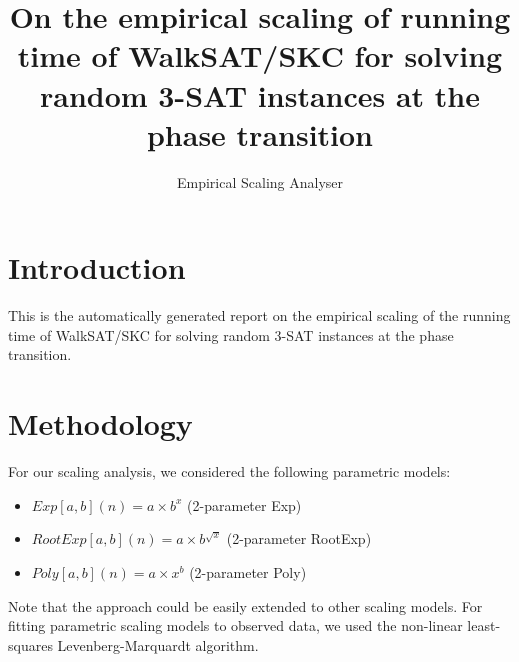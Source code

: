 \newcommand{\medianInterval}[1]{}
\newcommand{\randomizedAlgorithm}[1]{}


\makeatletter

\providecommand{\tabularnewline}{\\}


\title{On the empirical scaling of running time of WalkSAT/SKC for solving random 3-SAT instances at the phase transition}
\author{Empirical Scaling Analyser}

\makeatother

\usepackage{babel}

\maketitle %


\section{Introduction}

This is the automatically generated report on the empirical scaling
of the running time of WalkSAT/SKC for solving random 3-SAT instances at the phase transition.


\section{Methodology}

\label{sec:Methodology}

For our scaling analysis, we considered the following parametric models:
\begin{itemize} 
\item $Exp\left[a,b\right]\left(n\right)=a\times b^{x}$ \quad{}(2-parameter Exp)\item $RootExp\left[a,b\right]\left(n\right)=a\times b^{\sqrt{x}}$ \quad{}(2-parameter RootExp)\item $Poly\left[a,b\right]\left(n\right)=a\times x^{b}$ \quad{}(2-parameter Poly)\end{itemize}
Note that the approach could be easily extended to other scaling models.
For fitting parametric scaling models to observed data, we used the
non-linear least-squares Levenberg-Marquardt algorithm.

